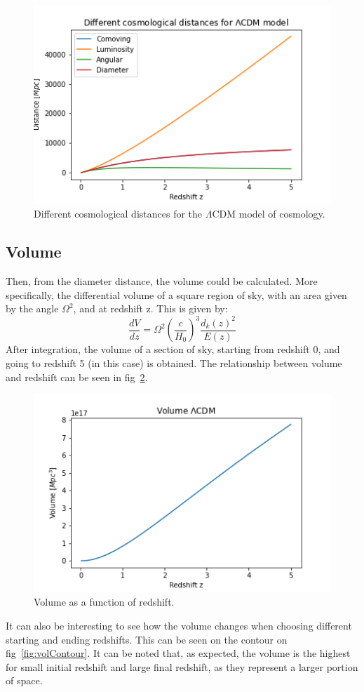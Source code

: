 \documentclass[12pt]{article}
\begin{document}
\begin{figure}[h]
	\centering
	\includegraphics[width=0.6\linewidth]{cosmoDistances.png}
	\caption{Different cosmological distances for the $\Lambda$CDM model of cosmology.}
	\label{fig:cosmoDistances}
\end{figure}

\subsection{Volume}
Then, from the diameter distance, the volume could be calculated. More specifically, the differential volume of a square region of sky, with an area given by the angle $\Omega^{2}$, and at redshift z. This is given by:
\begin{equation}
	\frac{dV}{dz} = \Omega^{2} \left( \frac{c}{H_{0}} \right)^{3} \frac{d_{k}(z)^{2}}{E(z)}
	\label{eq:diffVolume}
\end{equation}
After integration, the volume of a section of sky, starting from redshift 0, and going to redshift 5 (in this case) is obtained. The relationship between volume and redshift can be seen in fig~\ref{fig:volLCDM}.

\begin{figure}[ht]
	\centering
	\includegraphics[width=0.6\linewidth]{volumeLCDM.png}
	\caption{Volume as a function of redshift.}
	\label{fig:volLCDM}
\end{figure}

It can also be interesting to see how the volume changes when choosing different starting and ending redshifts. This can be seen on the contour on fig~\ref{fig:volContour}. It can be noted that, as expected, the volume is the highest for small initial redshift and large final redshift, as they represent a larger portion of space.
\end{document}
